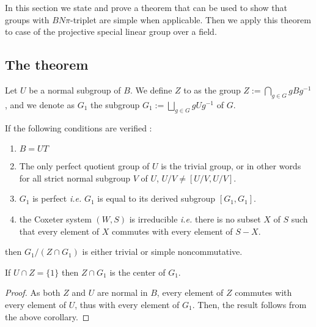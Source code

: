 In this section we state and prove a theorem that can be used to show that groups with $BN\pi$-triplet are simple when applicable. Then we apply this theorem to case of the projective special linear group over a field.

\subsection{The theorem}

    Let $U$ be a normal subgroup of $B$. We define $Z$ to as the group $Z := \bigcap_{g \in G} g B g^{-1}$, and we denote as  $G_1$ the subgroup $G_1 := \bigsqcup_{g \in G} g U g^{-1}$ of $G$.

\begin{theoreme} \label{thm:simple}
If the following conditions are verified :
\begin{enumerate}
    \item \label{simple1} $B = UT$
    \item \label{simple2} The only perfect quotient group of $U$ is the trivial  group, or in other words for all strict normal subgroup $V$ of $U$,  $U / V \neq  [ U / V, U/V]$.
    \item \label{simple3}$G_1$ is perfect \textit{i.e. } $G_1$ is equal to its derived subgroup $[G_1,G_1]$.
    \item \label{simple4} the Coxeter system $\left( W,S \right)$ is irreducible \textit{i.e.} there is no subset $X$ of $S$ such that every element of $X$ commutes with every element of $S-X$.
\end{enumerate} 
    then $G_1 / \left( Z \cap G_1 \right)$ is either trivial or simple noncommutative.
\end{theoreme}

\begin{corollary} \label{cor:2}
    If $U \cap Z = \{1\}$ then $Z \cap G_1$ is the center of $G_1$.
\end{corollary}

\begin{proof}
    As both $Z$ and $U$ are normal in $B$, every element of $Z$ commutes with every element of $U$, thus with every element of $G_1$. Then, the result follows from the above corollary.
\end{proof}


